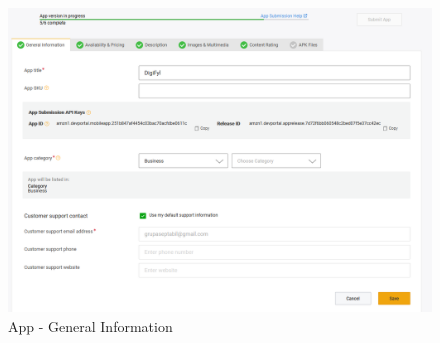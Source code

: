 	 	 	 \begin{figure}[H]
	 	 		\centering
	 	 		\includegraphics[scale=0.55]{./slike/amzn2.png}
	 	 		\caption{App - General Information}
	 	 		\label{fig:amzn2}
	 	 	\end{figure}
 	 	
